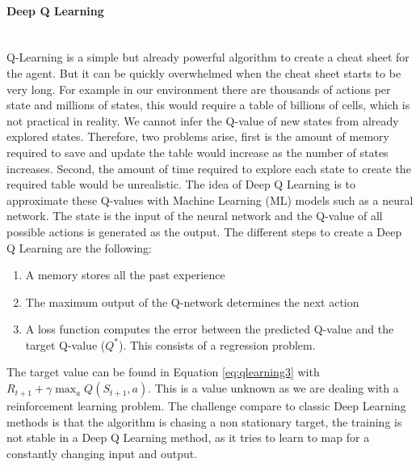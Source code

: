        \paragraph{Deep Q Learning}~\\
        Q-Learning is a simple but already powerful algorithm to create a cheat sheet for the agent. But it can be quickly overwhelmed when the cheat sheet starts to be very long. For example in our environment there are thousands of actions per state and millions of states, this would require a table of billions of cells, which is not practical in reality. We cannot infer the Q-value of new states from already explored states. Therefore, two problems arise, first is the amount of memory required to save and update the table would increase as the number of states increases. Second, the amount of time required to explore each state to create the required table would be unrealistic. The idea of Deep Q Learning is to approximate these Q-values with Machine Learning (ML) models such as a neural network. The state is the input of the neural network and the Q-value of all possible actions is generated as the output. The different steps to create a Deep Q Learning are the following:
        \begin{enumerate}
            \item A memory stores all the past experience
            \item The maximum output of the Q-network determines the next action
            \item A loss function computes the error between the predicted Q-value and the target Q-value ($Q^*$). This consists of a regression problem.
        \end{enumerate}
        The target value can be found in Equation \ref{eq:qlearning3} with $R_{t+1} + \gamma \max_a Q(S_{t+1}, a)$. This is a value unknown as we are dealing with a reinforcement learning problem. The challenge compare to classic Deep Learning methods is that the algorithm is chasing a non stationary target, the training is not stable in a Deep Q Learning method, as it tries to learn to map for a constantly changing input and output.
        
